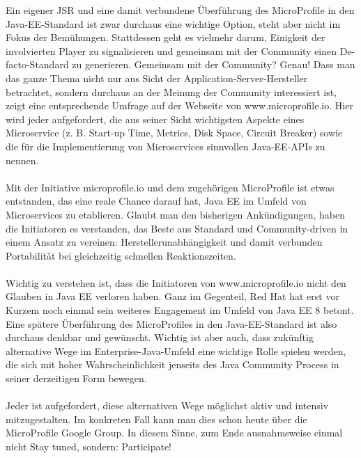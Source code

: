 Ein eigener JSR und eine damit verbundene Überführung des MicroProfile in den Java-EE-Standard ist zwar durchaus eine wichtige Option, steht aber nicht im Fokus der Bemühungen. Stattdessen geht es vielmehr darum, Einigkeit der involvierten Player zu signalisieren und gemeinsam mit der Community einen De-facto-Standard zu generieren. Gemeinsam mit der Community? Genau! Dass man das ganze Thema nicht nur aus Sicht der Application-Server-Hersteller betrachtet, sondern durchaus an der Meinung der Community interessiert ist, zeigt eine entsprechende Umfrage auf der Webseite von www.microprofile.io. Hier wird jeder aufgefordert, die aus seiner Sicht wichtigsten Aspekte eines Microservice (z. B. Start-up Time, Metrics, Disk Space, Circuit Breaker) sowie die für die Implementierung von Microservices sinnvollen Java-EE-APIs zu nennen. \\ \\
Mit der Initiative microprofile.io und dem zugehörigen MicroProfile ist etwas entstanden, das eine reale Chance darauf hat, Java EE im Umfeld von Microservices zu etablieren. Glaubt man den bisherigen Ankündigungen, haben die Initiatoren es verstanden, das Beste aus Standard und Community-driven in einem Ansatz zu vereinen: Herstellerunabhängigkeit und damit verbunden Portabilität bei gleichzeitig schnellen Reaktionszeiten.\\ \\
Wichtig zu verstehen ist, dass die Initiatoren von www.microprofile.io nicht den Glauben in Java EE verloren haben. Ganz im Gegenteil, Red Hat hat erst vor Kurzem noch einmal sein weiteres Engagement im Umfeld von Java EE 8 betont. Eine spätere Überführung des MicroProfiles in den Java-EE-Standard ist also durchaus denkbar und gewünscht. Wichtig ist aber auch, dass zukünftig alternative Wege im Enterprise-Java-Umfeld eine wichtige Rolle spielen werden, die sich mit hoher Wahrscheinlichkeit jenseits des Java Community Process in seiner derzeitigen Form bewegen.\\ \\
Jeder ist aufgefordert, diese alternativen Wege möglichst aktiv und intensiv mitzugestalten. Im konkreten Fall kann man dies schon heute über die MicroProfile Google Group. In diesem Sinne, zum Ende ausnahmsweise einmal nicht Stay tuned, sondern: Participate!




\ifCLASSOPTIONcaptionsoff
  \newpage
\fi